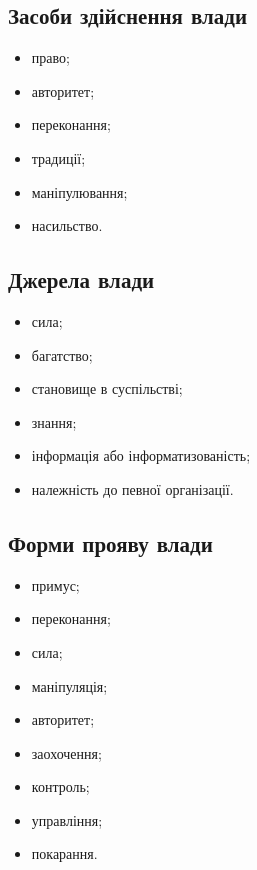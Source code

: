 \subsection{Засоби здійснення влади}
\begin{itemize}
\item право;
\item авторитет;
\item переконання;
\item традиції;
\item маніпулювання;
\item насильство.
\end{itemize}
\subsection{Джерела влади}
\begin{itemize}
\item сила;
\item багатство;
\item становище в суспільстві;
\item знання;
\item інформація або інформатизованість;
\item належність до певної організації.
\end{itemize}
\subsection{Форми прояву влади}
\begin{itemize}
\item примус;
\item переконання;
\item сила;
\item маніпуляція;
\item авторитет;
\item заохочення;
\item контроль;
\item управління;
\item покарання.
\end{itemize}
